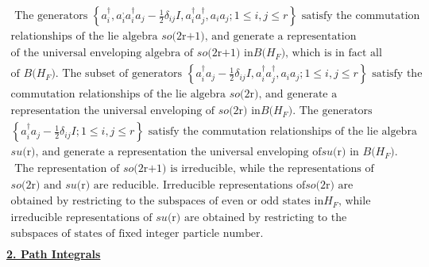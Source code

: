 \documentclass{amsart}
\begin{document}
\[
\begin{array}{l}
 \mbox{ The generators }\left\{ {a_i^\dag ,a_i^ ,a_i^\dag a_j
-\frac{1}{2}\delta _{ij} I,a_i^\dag a_j^\dag ,a_i a_j ;1\leqslant
i,j\leqslant r} \right\}\mbox{ satisfy the commutation } \\
 \mbox{relationships of the lie algebra }so\mbox{(2r+1), and generate a
representation } \\
 \mbox{of the universal enveloping algebra of }so\mbox{(2r+1) in
}B\mbox{(}H_F \mbox{), which is in fact all } \\
 \mbox{of }B\mbox{(}H_F \mbox{). The subset of generators }\left\{ {a_i^\dag
a_j -\frac{1}{2}\delta _{ij} I,a_i^\dag a_j^\dag ,a_i a_j ;1\leqslant
i,j\leqslant r} \right\}\mbox{ satisfy the } \\
 \mbox{commutation relationships of the lie algebra }so\mbox{(2r), and
generate a } \\
 \mbox{representation the universal enveloping of }so\mbox{(2r) in
}B\mbox{(}H_F \mbox{). The generators } \\
 \left\{ {a_i^\dag a_j -\frac{1}{2}\delta _{ij} I;1\leqslant i,j\leqslant r}
\right\}\mbox{ satisfy the commutation relationships of the lie algebra } \\
 su\mbox{(r), and generate a representation the universal enveloping of
}su\mbox{(r) in }B\mbox{(}H_F \mbox{). } \\
 \mbox{ The representation of }so\mbox{(2r+1) is irreducible, while the
representations of } \\
 so\mbox{(2r) and }su\mbox{(r) are reducible. Irreducible representations of
}so\mbox{(2r) are } \\
 \mbox{obtained by restricting to the subspaces of even or odd states in
}H_F \mbox{, while} \\
 \mbox{irreducible representations of }su\mbox{(r) are obtained by
restricting to the } \\
 \mbox{subspaces of states of fixed integer particle number. } \\
 \end{array}
\]
\newpage
\underline {\textbf{2. Path Integrals}}
\end{document}
